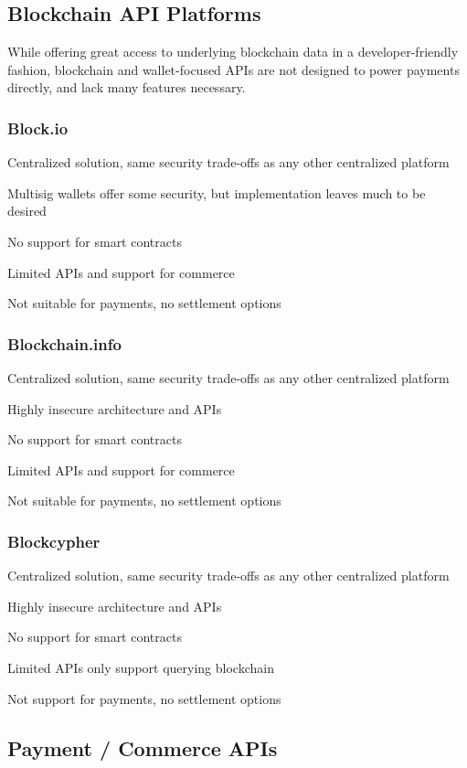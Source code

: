 \documentclass[11pt]{article}
\begin{document}
\subsection{Blockchain API Platforms}

While offering great access to underlying blockchain data in a developer-friendly fashion, blockchain and wallet-focused APIs are not designed to power payments directly, and lack many features necessary.


\subsubsection{Block.io}

Centralized solution, same security trade-offs as any other centralized platform


Multisig wallets offer some security, but implementation leaves much to be desired


No support for smart contracts


Limited APIs and support for commerce


Not suitable for payments, no settlement options


\subsubsection{Blockchain.info}

Centralized solution, same security trade-offs as any other centralized platform


Highly insecure architecture and APIs


No support for smart contracts


Limited APIs and support for commerce


Not suitable for payments, no settlement options


\subsubsection{Blockcypher}

Centralized solution, same security trade-offs as any other centralized platform


Highly insecure architecture and APIs


No support for smart contracts


Limited APIs only support querying blockchain


Not support for payments, no settlement options


\subsection{Payment / Commerce APIs}
\end{document}

